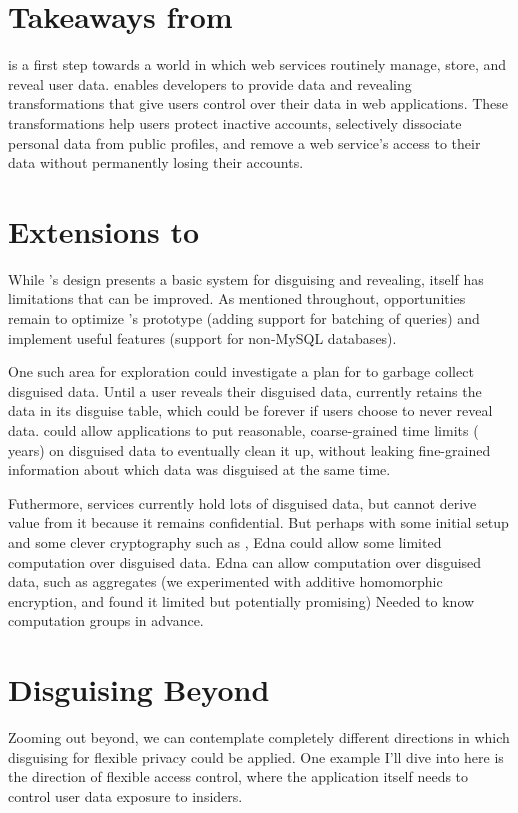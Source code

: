 \section{Takeaways from \sys}
%
\sys is a first step towards a world in which web services
routinely manage, store, and reveal \xxed user data.
%
\sys enables developers to provide data \xxing and revealing
transformations that give users control over their data in web applications.
%
These transformations help users protect inactive accounts, selectively dissociate
personal data from public profiles, and remove a web service's access to their
data without permanently losing their accounts.
%

\section{Extensions to \sys}
While \sys's design presents a basic system for disguising and revealing, \sys
itself has limitations that can be improved. 
%
As mentioned throughout, opportunities remain to optimize \sys's prototype
(\eg adding support for batching of queries) and implement useful features 
(\eg support for non-MySQL databases). 
%

One such area for exploration could investigate a plan for \sys to garbage
collect disguised data.  Until a user reveals their disguised data, \sys
currently retains the data in its disguise table, which could be forever if
users choose to never reveal data.
%
\sys could allow applications to put reasonable, coarse-grained time limits ( years) on disguised data to eventually clean it up, without leaking
fine-grained information about which data was disguised at the same time.

%
Futhermore, services currently hold lots of disguised data, but cannot derive
value from it because it remains confidential. But perhaps with some initial
setup and some clever cryptography such as ,
Edna could allow some limited computation over disguised data.
%
Edna can allow computation over disguised data, such as aggregates (we
experimented with additive homomorphic encryption, and found it limited but
potentially promising) Needed to know computation groups in advance.

\section{Disguising Beyond \sys}
Zooming out beyond, we can contemplate completely different directions in which
disguising for flexible privacy could be applied. One example I’ll dive into
here is the direction of flexible access control, where the application itself
needs to control user data exposure to insiders.

